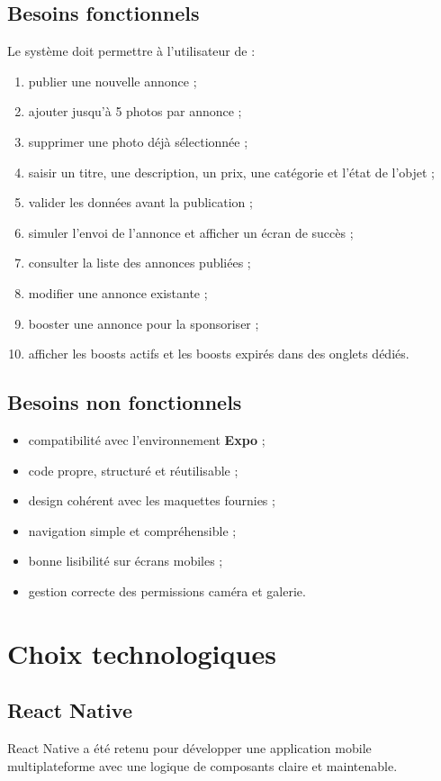 \documentclass[12pt,a4paper]{report}
\begin{document}
\section{Besoins fonctionnels}
Le système doit permettre à l'utilisateur de :
\begin{enumerate}
  \item publier une nouvelle annonce ;
  \item ajouter jusqu'à 5 photos par annonce ;
  \item supprimer une photo déjà sélectionnée ;
  \item saisir un titre, une description, un prix, une catégorie et l'état de l'objet ;
  \item valider les données avant la publication ;
  \item simuler l'envoi de l'annonce et afficher un écran de succès ;
  \item consulter la liste des annonces publiées ;
  \item modifier une annonce existante ;
  \item booster une annonce pour la sponsoriser ;
  \item afficher les boosts actifs et les boosts expirés dans des onglets dédiés.
\end{enumerate}

\section{Besoins non fonctionnels}
\begin{itemize}
  \item compatibilité avec l'environnement \textbf{Expo} ;
  \item code propre, structuré et réutilisable ;
  \item design cohérent avec les maquettes fournies ;
  \item navigation simple et compréhensible ;
  \item bonne lisibilité sur écrans mobiles ;
  \item gestion correcte des permissions caméra et galerie.
\end{itemize}

\chapter{Choix technologiques}
\section{React Native}
React Native a été retenu pour développer une application mobile multiplateforme avec une logique de composants claire et maintenable.
\end{document}
